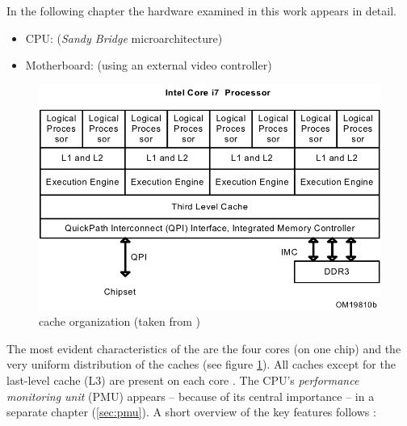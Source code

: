 \label{sec:technical-prerequisites}

In the following chapter the hardware examined in this work appears in detail.


\label{sec:hw-products}

\begin{itemize}

\item CPU: \JWPLcpu{} (\emph{Sandy Bridge}\cite{wiki:snb} microarchitecture)

\item Motherboard: \JWPLboard{} (using an external video controller)

\end{itemize}


\label{sec:sandy-bridge}

\begin{figure}
  \centering
    \includegraphics[width=\textwidth]{fig/intel-cache-orga.png}
  \caption{\JWPcpu{} cache organization (taken from \cite{intel2011softdev1})}
  \label{fig:cache-orga}
\end{figure}

The most evident characteristics of the \JWPcpu{} are the four cores (on one
chip) and the very uniform distribution of the caches (see figure
\ref{fig:cache-orga}). All caches except for the last-level cache (L3) are
present on each core \cite{fog11}. The CPU's \emph{performance monitoring unit}
(PMU) appears -- because of its central importance -- in a separate chapter
(\ref{sec:pmu}). A short overview of the key features follows
\cite{intel2011spec}:

